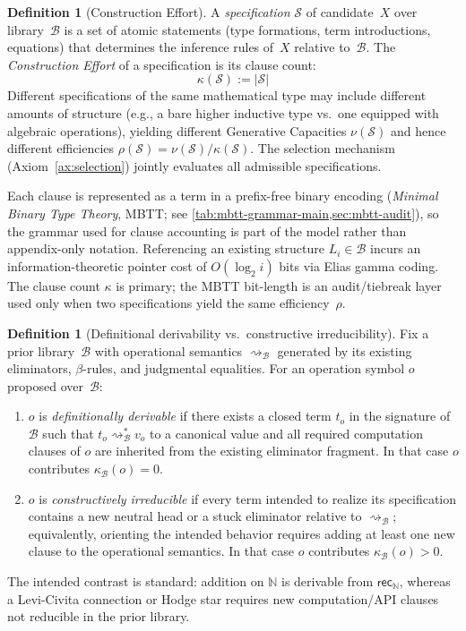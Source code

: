 \documentclass[11pt,a4paper]{article}
\theoremstyle{plain}
\theoremstyle{definition}
\newtheorem{definition}[theorem]{Definition}
\theoremstyle{remark}
\begin{document}
\begin{definition}[Construction Effort]
\label{def:effort}
A \emph{specification} $\mathcal{S}$ of candidate~$X$ over library~$\mathcal{B}$ is a set of atomic statements (type formations, term introductions, equations) that determines the inference rules of~$X$ relative to~$\mathcal{B}$.
The \emph{Construction Effort} of a specification is its clause count:
\begin{equation}
    \kappa(\mathcal{S}) := |\mathcal{S}|
\end{equation}
Different specifications of the same mathematical type may include different amounts of structure (e.g., a bare higher inductive type vs.\ one equipped with algebraic operations), yielding different Generative Capacities $\nu(\mathcal{S})$ and hence different efficiencies $\rho(\mathcal{S}) = \nu(\mathcal{S}) / \kappa(\mathcal{S})$.
The selection mechanism (Axiom~\ref{ax:selection}) jointly evaluates all admissible specifications.

Each clause is represented as a term in a prefix-free binary encoding (\emph{Minimal Binary Type Theory}, MBTT; see \cref{tab:mbtt-grammar-main,sec:mbtt-audit}), so the grammar used for clause accounting is part of the model rather than appendix-only notation.
Referencing an existing structure $L_i \in \mathcal{B}$ incurs an information-theoretic pointer cost of $O(\log_2 i)$ bits via Elias gamma coding.
The clause count $\kappa$ is primary; the MBTT bit-length is an audit/tiebreak layer used only when two specifications yield the same efficiency~$\rho$.
\end{definition}

\begin{definition}[Definitional derivability vs.\ constructive irreducibility]
\label{def:derivability}
Fix a prior library~$\mathcal{B}$ with operational semantics $\rightsquigarrow_{\mathcal{B}}$ generated by its existing eliminators, $\beta$-rules, and judgmental equalities.
For an operation symbol $o$ proposed over~$\mathcal{B}$:
\begin{enumerate}[nosep]
    \item $o$ is \emph{definitionally derivable} if there exists a closed term $t_o$ in the signature of~$\mathcal{B}$ such that $t_o \rightsquigarrow_{\mathcal{B}}^{*} v_o$ to a canonical value and all required computation clauses of $o$ are inherited from the existing eliminator fragment.  In that case $o$ contributes $\kappa_{\mathcal{B}}(o)=0$.
    \item $o$ is \emph{constructively irreducible} if every term intended to realize its specification contains a new neutral head or a stuck eliminator relative to $\rightsquigarrow_{\mathcal{B}}$; equivalently, orienting the intended behavior requires adding at least one new clause to the operational semantics.  In that case $o$ contributes $\kappa_{\mathcal{B}}(o)>0$.
\end{enumerate}
The intended contrast is standard: addition on $\mathbb{N}$ is derivable from $\mathsf{rec}_{\mathbb{N}}$, whereas a Levi-Civita connection or Hodge star requires new computation/API clauses not reducible in the prior library.
\end{definition}
\end{document}
